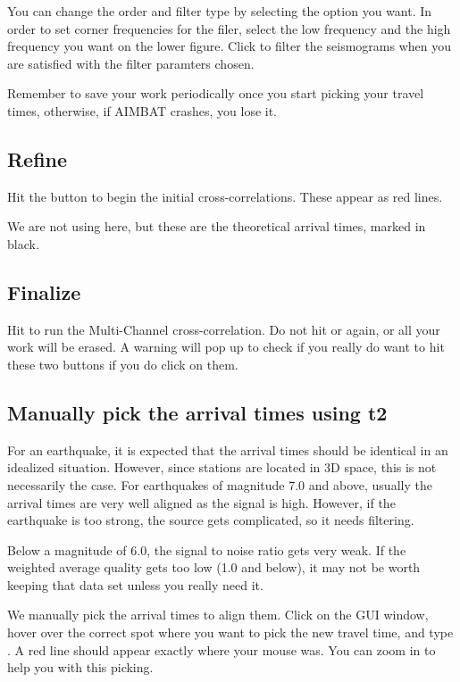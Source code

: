 \documentclass[letterpaper,10pt,english]{sphinxmanual}
\begin{document}
You can change the order and filter type by selecting the option you want. In order to set corner frequencies for the filer, select the low frequency and the high frequency you want on the lower figure. Click  to filter the seismograms when you are satisfied with the filter paramters chosen.

Remember to save your work periodically once you start picking your travel times, otherwise, if AIMBAT crashes, you lose it.


\subsection{Refine}
\label{docfiles/PickingTravelTimes:refine}
Hit the  button to begin the initial cross-correlations. These appear as red lines.

We are not using  here, but these are the theoretical arrival times, marked in black.


\subsection{Finalize}
\label{docfiles/PickingTravelTimes:finalize}
Hit  to run the Multi-Channel cross-correlation. Do not hit  or  again, or all your work will be erased. A warning will pop up to check if you really do want to hit these two buttons if you do click on them.


\subsection{Manually pick the arrival times using t2}
\label{docfiles/PickingTravelTimes:manually-pick-the-arrival-times-using-t2}
For an earthquake, it is expected that the arrival times should be identical in an idealized situation. However, since stations are located in 3D space, this is not necessarily the case. For earthquakes of magnitude 7.0 and above, usually the arrival times are very well aligned as the signal is high. However, if the earthquake is too strong, the source gets complicated, so it needs filtering.

Below a magnitude of 6.0, the signal to noise ratio gets very weak. If the weighted average quality gets too low (1.0 and below), it may not be worth keeping that data set unless you really need it.

We manually pick the arrival times to align them. Click on the GUI window, hover over the correct spot where you want to pick the new travel time, and type . A red line should appear exactly where your mouse was. You can zoom in to help you with this picking.
\end{document}
